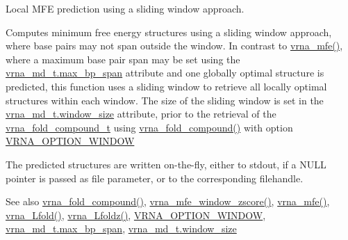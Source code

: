 Local M\+FE prediction using a sliding window approach. 

Computes minimum free energy structures using a sliding window approach, where base pairs may not span outside the window. In contrast to \mbox{\hyperlink{group__mfe__fold_gabd3b147371ccf25c577f88bbbaf159fd}{vrna\+\_\+mfe()}}, where a maximum base pair span may be set using the \mbox{\hyperlink{group__model__details_a659e5fcc6e8c9f1a68e7de6548eef3b0}{vrna\+\_\+md\+\_\+t.\+max\+\_\+bp\+\_\+span}} attribute and one globally optimal structure is predicted, this function uses a sliding window to retrieve all locally optimal structures within each window. The size of the sliding window is set in the \mbox{\hyperlink{group__model__details_abea42f9229f8d8d6bcbedef316315bfc}{vrna\+\_\+md\+\_\+t.\+window\+\_\+size}} attribute, prior to the retrieval of the \mbox{\hyperlink{group__fold__compound_ga1b0cef17fd40466cef5968eaeeff6166}{vrna\+\_\+fold\+\_\+compound\+\_\+t}} using \mbox{\hyperlink{group__fold__compound_ga6601d994ba32b11511b36f68b08403be}{vrna\+\_\+fold\+\_\+compound()}} with option \mbox{\hyperlink{group__fold__compound_ga2b2a8009ccdccc3eb1571556261aee8e}{V\+R\+N\+A\+\_\+\+O\+P\+T\+I\+O\+N\+\_\+\+W\+I\+N\+D\+OW}}

The predicted structures are written on-\/the-\/fly, either to stdout, if a N\+U\+LL pointer is passed as file parameter, or to the corresponding filehandle.

\begin{DoxySeeAlso}{See also}
\mbox{\hyperlink{group__fold__compound_ga6601d994ba32b11511b36f68b08403be}{vrna\+\_\+fold\+\_\+compound()}}, \mbox{\hyperlink{group__local__mfe__fold_gaa4f67ae94efd08d800c17f9b53423fd6}{vrna\+\_\+mfe\+\_\+window\+\_\+zscore()}}, \mbox{\hyperlink{group__mfe__fold_gabd3b147371ccf25c577f88bbbaf159fd}{vrna\+\_\+mfe()}}, \mbox{\hyperlink{group__local__mfe__fold_ga4918cce52bf69c1913cda503b2ac75d8}{vrna\+\_\+\+Lfold()}}, \mbox{\hyperlink{group__local__mfe__fold_ga27fddda5fc63eb49c861e38845fc34b4}{vrna\+\_\+\+Lfoldz()}}, \mbox{\hyperlink{group__fold__compound_ga2b2a8009ccdccc3eb1571556261aee8e}{V\+R\+N\+A\+\_\+\+O\+P\+T\+I\+O\+N\+\_\+\+W\+I\+N\+D\+OW}}, \mbox{\hyperlink{group__model__details_a659e5fcc6e8c9f1a68e7de6548eef3b0}{vrna\+\_\+md\+\_\+t.\+max\+\_\+bp\+\_\+span}}, \mbox{\hyperlink{group__model__details_abea42f9229f8d8d6bcbedef316315bfc}{vrna\+\_\+md\+\_\+t.\+window\+\_\+size}}
\end{DoxySeeAlso}

